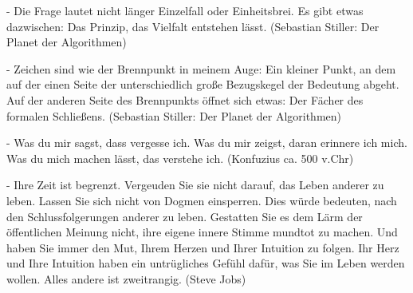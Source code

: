 -   Die Frage lautet nicht länger Einzelfall oder Einheitsbrei. Es gibt etwas dazwischen:
    Das Prinzip, das Vielfalt entstehen lässt. (Sebastian Stiller: Der Planet der Algorithmen)

-   Zeichen sind wie der Brennpunkt in meinem Auge: Ein kleiner Punkt, an dem auf der einen 
    Seite der unterschiedlich große Bezugskegel der Bedeutung abgeht. Auf der anderen Seite des Brennpunkts
    öffnet sich etwas: Der Fächer des formalen Schließens. (Sebastian Stiller: Der Planet der Algorithmen)

-   Was du mir sagst, dass vergesse ich.
    Was du mir zeigst, daran erinnere ich mich.
    Was du mich machen lässt, das verstehe ich.
    (Konfuzius ca. 500 v.Chr)
    
-   Ihre Zeit ist begrenzt. Vergeuden Sie sie nicht darauf, das Leben anderer zu leben. Lassen Sie sich nicht von Dogmen einsperren. Dies würde bedeuten, nach den Schlussfolgerungen anderer zu leben. Gestatten Sie es dem Lärm der öffentlichen Meinung nicht, ihre eigene innere Stimme mundtot zu machen. Und haben Sie immer den Mut, Ihrem Herzen und Ihrer Intuition zu folgen. Ihr Herz und Ihre Intuition haben ein untrügliches Gefühl dafür, was Sie im Leben werden wollen. Alles andere ist zweitrangig.
    (Steve Jobs)    
